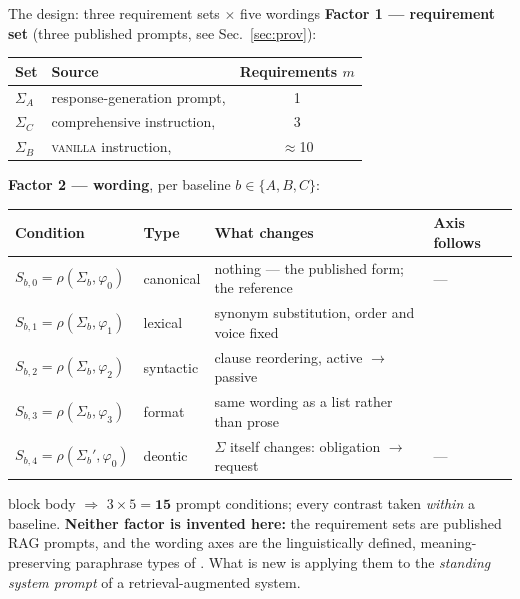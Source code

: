 \documentclass[11pt,aspectratio=169]{beamer}
\begin{document}
\begin{frame}[shrink=8]{The design: three requirement sets $\times$ five wordings}
  \textbf{Factor 1 --- requirement set} (three published prompts, see
  Sec.~\ref{sec:prov}):
  \begin{center}\scriptsize
  \begin{tabular}{@{}llc@{}}
    \toprule
    Set & Source & Requirements $m$ \\
    \midrule
    $\Sigma_A$ & response-generation prompt, \citet{friel2024ragbench} & 1 \\
    $\Sigma_C$ & comprehensive instruction, \citet{mao2024fitrag} & 3 \\
    $\Sigma_B$ & \textsc{vanilla} instruction, \citet{gao2023alce} & $\approx$10 \\
    \bottomrule
  \end{tabular}
  \end{center}
  \medskip
  \textbf{Factor 2 --- wording}, per baseline $b\in\{A,B,C\}$:
  \begin{center}\scriptsize
  \begin{tabular}{@{}llp{5.0cm}l@{}}
    \toprule
    Condition & Type & What changes & Axis follows \\
    \midrule
    $S_{b,0}=\rho(\Sigma_b,\varphi_0)$ & canonical & nothing --- the published form; the reference & --- \\
    $S_{b,1}=\rho(\Sigma_b,\varphi_1)$ & lexical   & synonym substitution, order and voice fixed & \citet{zhan2024lexical} \\
    $S_{b,2}=\rho(\Sigma_b,\varphi_2)$ & syntactic & clause reordering, active $\to$ passive & \citet{kostic2026samemeaning} \\
    $S_{b,3}=\rho(\Sigma_b,\varphi_3)$ & format    & same wording as a list rather than prose & \citet{sclar2024quantifying} \\
    $S_{b,4}=\rho(\Sigma_b',\varphi_0)$ & deontic   & \alert{$\Sigma$ itself changes}: obligation $\to$ request & --- \\
    \bottomrule
  \end{tabular}
  \end{center}
  \vspace{-0.2em}
  \begin{beamercolorbox}[wd=\textwidth,sep=4pt,rounded=true]{block body}\scriptsize
  \textbf{$\Rightarrow$} $3\times5=\mathbf{15}$ prompt conditions; every contrast
  taken \emph{within} a baseline. \textbf{Neither factor is invented here:} the
  requirement sets are published RAG prompts, and the wording axes are the
  linguistically defined, meaning-preserving paraphrase types of
  \citet{wahle2024paraphrase}. What is new is applying them to the
  \emph{standing system prompt} of a retrieval-augmented system.
  \end{beamercolorbox}
\end{frame}
\end{document}
